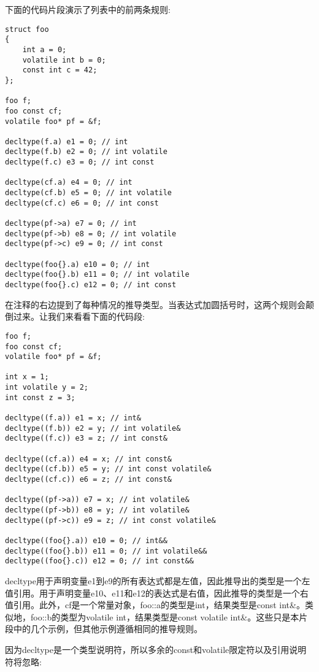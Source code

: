 下面的代码片段演示了列表中的前两条规则:

\begin{lstlisting}[style=styleCXX]
struct foo
{
	int a = 0;
	volatile int b = 0;
	const int c = 42;
};

foo f;
foo const cf;
volatile foo* pf = &f;

decltype(f.a) e1 = 0; // int
decltype(f.b) e2 = 0; // int volatile
decltype(f.c) e3 = 0; // int const

decltype(cf.a) e4 = 0; // int
decltype(cf.b) e5 = 0; // int volatile
decltype(cf.c) e6 = 0; // int const

decltype(pf->a) e7 = 0; // int
decltype(pf->b) e8 = 0; // int volatile
decltype(pf->c) e9 = 0; // int const

decltype(foo{}.a) e10 = 0; // int
decltype(foo{}.b) e11 = 0; // int volatile
decltype(foo{}.c) e12 = 0; // int const
\end{lstlisting}

在注释的右边提到了每种情况的推导类型。当表达式加圆括号时，这两个规则会颠倒过来。让我们来看看下面的代码段:

\begin{lstlisting}[style=styleCXX]
foo f;
foo const cf;
volatile foo* pf = &f;

int x = 1;
int volatile y = 2;
int const z = 3;

decltype((f.a)) e1 = x; // int&
decltype((f.b)) e2 = y; // int volatile&
decltype((f.c)) e3 = z; // int const&

decltype((cf.a)) e4 = x; // int const&
decltype((cf.b)) e5 = y; // int const volatile&
decltype((cf.c)) e6 = z; // int const&

decltype((pf->a)) e7 = x; // int volatile&
decltype((pf->b)) e8 = y; // int volatile&
decltype((pf->c)) e9 = z; // int const volatile&

decltype((foo{}.a)) e10 = 0; // int&&
decltype((foo{}.b)) e11 = 0; // int volatile&&
decltype((foo{}.c)) e12 = 0; // int const&&
\end{lstlisting}

decltype用于声明变量e1到e9的所有表达式都是左值，因此推导出的类型是一个左值引用。用于声明变量e10、e11和e12的表达式是右值，因此推导的类型是一个右值引用。此外，cf是一个常量对象，foo::a的类型是int，结果类型是const int\&。类似地，foo::b的类型为volatile int，结果类型是const volatile int\&。这些只是本片段中的几个示例，但其他示例遵循相同的推导规则。

因为decltype是一个类型说明符，所以多余的const和volatile限定符以及引用说明符将忽略:

